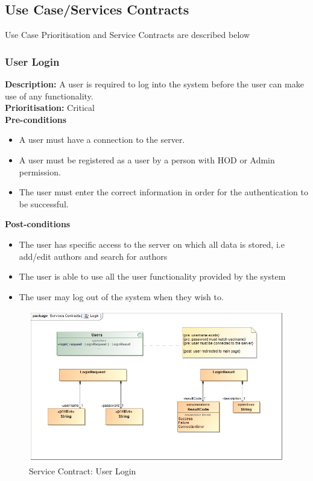 \documentclass[a4paper]{article}
\begin{document}
    \subsection{Use Case/Services Contracts}
	    Use Case Prioritisation and Service Contracts are described below
	 
    \subsubsection{User Login}
    	\textbf{Description:}  A user is required to log into the system before the user can make use of any functionality.
    	\\
        \textbf{Prioritisation:} Critical\\
        
        
          \textbf{Pre-conditions}
        \begin{itemize}
            \item A user must have a connection to the server.
            \item A user must be registered as a user by a person with HOD or Admin permission.
            \item The user must enter the correct information in order for the authentication to be successful.
        \end{itemize}
        
        \textbf{Post-conditions}
         \begin{itemize}
            \item The user has specific access to the server on which all data is stored, i.e add/edit authors and search for authors
            \item The user is able to use all the user functionality provided by the system 
            \item The user may log out of the system when they wish to.
        \end{itemize}
        
            	\begin{figure}[H]
            		\centering
            		\includegraphics[width=\textwidth]{../Assignment1/5.1.1.Login.Services.Contract.png}
            		\caption{Service Contract: User Login}
            	\end{figure}
        
\end{document}
